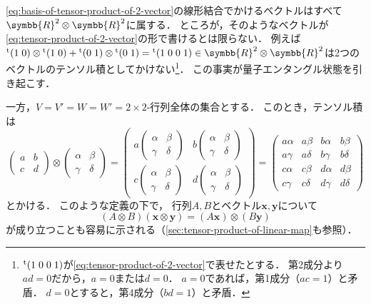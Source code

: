 \documentclass[../sotsu.tex]{subfiles}
\begin{document}
\cref{eq:basis-of-tensor-product-of-2-vector}の線形結合でかけるベクトルはすべて$\symbb{R}^2 \otimes \symbb{R}^2$に属する．
ところが，そのようなベクトルが\cref{eq:tensor-product-of-2-vector}の形で書けるとは限らない．
例えば\(
    \tp{(1 \; 0)} \otimes \tp{(1 \; 0)} + \tp{(0 \; 1)} \otimes \tp{(0 \; 1)}
    =
    \tp{(1 \; 0 \; 0 \; 1)} \in \symbb{R}^2 \otimes \symbb{R}^2
\)は2つのベクトルのテンソル積としてかけない\footnote{
    ${}^{\mathrm{t}}(1 \; 0 \; 0 \; 1)$が\cref{eq:tensor-product-of-2-vector}で表せたとする．
    第2成分より$ad = 0$だから，$a=0$または$d=0$．
    $a=0$であれば，第1成分（$ac = 1$）と矛盾．
    $d=0$とすると，第4成分（$bd = 1$）と矛盾．
}．
この事実が量子エンタングル状態を引き起こす．

一方，\( V = V' = W = W' = \text{$2 \times 2$-行列全体の集合} \)とする．
このとき，テンソル積は
\begin{equation}
    \label{eq:tensor-product-of-2-matrix}
    \begin{pmatrix}
        a  & b  \\ c  & d 
    \end{pmatrix}
    \otimes 
    \begin{pmatrix}
        \alpha & \beta \\ \gamma & \delta
    \end{pmatrix}
    =
    \begin{pmatrix}
        a
        \begin{pmatrix}
            \alpha & \beta \\ \gamma & \delta
        \end{pmatrix}
        &
        b
        \begin{pmatrix}
            \alpha & \beta \\ \gamma & \delta
        \end{pmatrix}
        \\
        c
        \begin{pmatrix}
            \alpha & \beta \\ \gamma & \delta
        \end{pmatrix}
        &
        d
        \begin{pmatrix}
            \alpha & \beta \\ \gamma & \delta
        \end{pmatrix}
    \end{pmatrix}
    =
    \begin{pmatrix}
        a \alpha  &  a \beta   &  b \alpha  &  b \beta   \\
        a \gamma  &  a \delta  &  b \gamma  &  b \delta  \\
        c \alpha  &  c \beta   &  d \alpha  &  d \beta   \\
        c \gamma  &  c \delta  &  d \gamma  &  d \delta  
    \end{pmatrix}
\end{equation}
とかける．
このような定義の下で，
行列$A, B$とベクトル$\symbf{x}, \symbf{y}$について
\begin{equation*}
    (A \otimes B) (\symbf{x} \otimes \symbf{y}) 
        = (A \symbf{x}) \otimes (B \symbf{y})
\end{equation*}
が成り立つことも容易に示される（\cref{sec:tensor-product-of-linear-map}も参照）．
\end{document}
